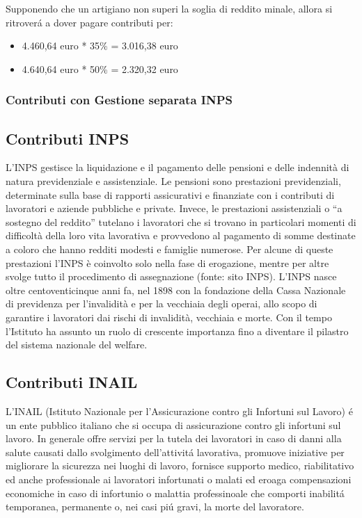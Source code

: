 \documentclass{article}
\begin{document}
Supponendo che un artigiano non superi la soglia di reddito minale, allora si ritrover\'a a dover pagare contributi per: 
\begin{itemize}
    \item 4.460,64 euro * 35\% = 3.016,38 euro
    \item 4.640,64 euro * 50\% = 2.320,32 euro
\end{itemize}

\subsubsection{Contributi con Gestione separata INPS}

\subsection{Contributi INPS}
L’INPS gestisce la liquidazione e il pagamento delle pensioni e delle indennità di natura previdenziale e assistenziale. Le pensioni sono prestazioni previdenziali, determinate sulla base di rapporti assicurativi e finanziate con i contributi di lavoratori e aziende pubbliche e private. Invece, le prestazioni assistenziali o “a sostegno del reddito” tutelano i lavoratori che si trovano in particolari momenti di difficoltà della loro vita lavorativa e provvedono al pagamento di somme destinate a coloro che hanno redditi modesti e famiglie numerose. Per alcune di queste prestazioni l’INPS è coinvolto solo nella fase di erogazione, mentre per altre svolge tutto il procedimento di assegnazione (fonte: sito INPS). L’INPS nasce oltre centoventicinque anni fa, nel 1898 con la fondazione della Cassa Nazionale di previdenza per l'invalidità e per la vecchiaia degli operai, allo scopo di garantire i lavoratori dai rischi di invalidità, vecchiaia e morte. Con il tempo l’Istituto ha assunto un ruolo di crescente importanza fino a diventare il pilastro del sistema nazionale del welfare.

\subsection{Contributi INAIL}
L'INAIL (Istituto Nazionale per l'Assicurazione contro gli Infortuni sul Lavoro) \'e un ente pubblico italiano che si occupa di assicurazione contro gli infortuni sul lavoro.
In generale offre servizi per la tutela dei lavoratori in caso di danni alla salute causati dallo svolgimento dell'attivit\'a lavorativa, promuove iniziative per migliorare la sicurezza nei luoghi di lavoro, 
fornisce supporto medico, riabilitativo ed anche professionale ai lavoratori infortunati o malati ed eroaga compensazioni economiche in caso di infortunio o malattia professinoale che comporti inabilit\'a temporanea, permanente o, nei casi pi\'u gravi, la morte del lavoratore.
\end{document}
